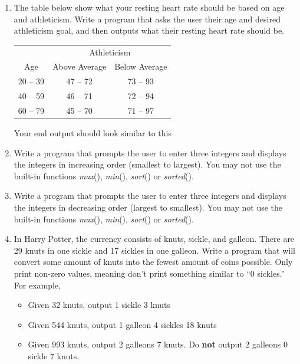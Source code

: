 \documentclass{article}
\begin{document}
\begin{enumerate}
	\item 
		The table below show what your resting heart rate should be based on age and athleticism.  
		Write a program that asks the user their age and desired athleticism goal, and then outputs 
		what their resting heart rate should be.

		\begin{minipage}{.45\textwidth}
			\begin{tabular}{c|cc}
				& \multicolumn{2}{c}{Athleticism}\\
				Age & Above Average & Below Average \\ \hline
				20 -- 39 & 47 -- 72 & 73 -- 93\\
				40 -- 59 & 46 -- 71 & 72 -- 94\\
				60 -- 79 & 45 -- 70 & 71 -- 97 \\
			\end{tabular}
		\end{minipage}
		\begin{minipage}{.45\textwidth}
			\vspace*{1em}
			Your end output should look similar to this
		\end{minipage}


	\item 
		Write a program that prompts the user to enter three integers and displays the integers 
		in increasing order (smallest to largest).  You may not use the built-in functions 
		\textit{max}(), \textit{min}(), \textit{sort}() or \textit{sorted}().


	\item 
		Write a program that prompts the user to enter three integers and displays the integers 
		in decreasing order (largest to smallest).  You may not use the built-in functions 
		\textit{max}(), \textit{min}(), \textit{sort}() or \textit{sorted}().


	\item 
		In Harry Potter, the currency consists of knuts, sickle, and galleon.  There are 29 knuts in 
		one sickle and 17 sickles in one galleon.  Write a program that will convert some amount of 
		knuts into the fewest amount of coins possible.  Only print non-zero values, meaning don't print 
		something similar to ``0 sickles.''  For example,
		\begin{itemize}
			\item Given 32 knuts, output 1 sickle 3 knuts
			\item Given 544 knuts, output 1 galleon 4 sickles 18 knuts
			\item Given 993 knuts, output 2 galleons 7 knuts. 
				Do \textbf{not} output 2 galleons 0 sickle 7 knuts.
		\end{itemize}




\end{enumerate}
\end{document}
